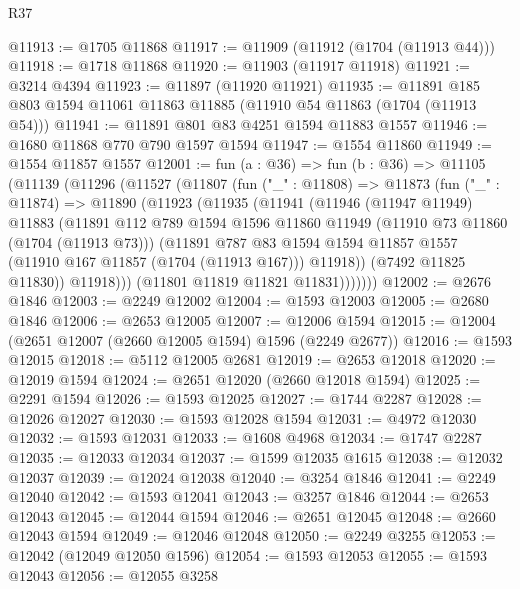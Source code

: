\begin{lexlean}{R37}
\begin{coremodule}
@11913 := @1705 @11868
@11917 := @11909 (@11912 (@1704 (@11913 @44)))
@11918 := @1718 @11868
@11920 := @11903 (@11917 @11918)
@11921 := @3214 @4394
@11923 := @11897 (@11920 @11921)
@11935 := @11891 @185 @803 @1594 @11061 @11863 @11885 (@11910 @54 @11863 (@1704 (@11913 @54)))
@11941 := @11891 @801 @83 @4251 @1594 @11883 @1557
@11946 := @1680 @11868 @770 @790 @1597 @1594
@11947 := @1554 @11860
@11949 := @1554 @11857 @1557
@12001 := fun (a : @36) =>
  fun (b : @36) =>
  @11105
    (@11139
      (@11296
        (@11527
          (@11807
            (fun ("_" : @11808) =>
            @11873
              (fun ("_" : @11874) =>
              @11890
                (@11923
                  (@11935
                    (@11941
                      (@11946
                        (@11947 @11949)
                        @11883
                        (@11891
                          @112
                          @789
                          @1594
                          @1596
                          @11860
                          @11949
                          (@11910 @73 @11860 (@1704 (@11913 @73)))
                          (@11891
                            @787
                            @83
                            @1594
                            @1594
                            @11857
                            @1557
                            (@11910 @167 @11857 (@1704 (@11913 @167)))
                            @11918))
                        (@7492 @11825 @11830))
                      @11918)))
                (@11801 @11819 @11821 @11831)))))))
@12002 := @2676 @1846
@12003 := @2249 @12002
@12004 := @1593 @12003
@12005 := @2680 @1846
@12006 := @2653 @12005
@12007 := @12006 @1594
@12015 := @12004 (@2651 @12007 (@2660 @12005 @1594) @1596 (@2249 @2677))
@12016 := @1593 @12015
@12018 := @5112 @12005 @2681
@12019 := @2653 @12018
@12020 := @12019 @1594
@12024 := @2651 @12020 (@2660 @12018 @1594)
@12025 := @2291 @1594
@12026 := @1593 @12025
@12027 := @1744 @2287
@12028 := @12026 @12027
@12030 := @1593 @12028 @1594
@12031 := @4972 @12030
@12032 := @1593 @12031
@12033 := @1608 @4968
@12034 := @1747 @2287
@12035 := @12033 @12034
@12037 := @1599 @12035 @1615
@12038 := @12032 @12037
@12039 := @12024 @12038
@12040 := @3254 @1846
@12041 := @2249 @12040
@12042 := @1593 @12041
@12043 := @3257 @1846
@12044 := @2653 @12043
@12045 := @12044 @1594
@12046 := @2651 @12045
@12048 := @2660 @12043 @1594
@12049 := @12046 @12048
@12050 := @2249 @3255
@12053 := @12042 (@12049 @12050 @1596)
@12054 := @1593 @12053
@12055 := @1593 @12043
@12056 := @12055 @3258

\end{coremodule}
\end{lexlean}
